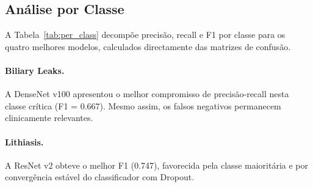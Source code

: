 \documentclass[runningheads]{llncs}
\begin{document}
\subsection{Análise por Classe}

A Tabela~\ref{tab:per_class} decompõe precisão, recall e F1 por classe para
os quatro melhores modelos, calculados directamente das matrizes de confusão.

\begin{table}[ht]
\caption{Precisão (P), Recall (R) e F1 por classe no conjunto de teste.
  Valores em negrito indicam o melhor F1 por célula.}
\label{tab:per_class}
\centering
\small
{}
\normalsize
\end{table}

\paragraph{Biliary Leaks.}
A DenseNet v100 apresentou o melhor compromisso de precisão-recall nesta classe
crítica (F1 = 0.667). Mesmo assim, os falsos negativos permanecem clinicamente
relevantes.

\paragraph{Lithiasis.}
A ResNet v2 obteve o melhor F1 (0.747), favorecida pela classe maioritária e
por convergência estável do classificador com Dropout.
\end{document}
